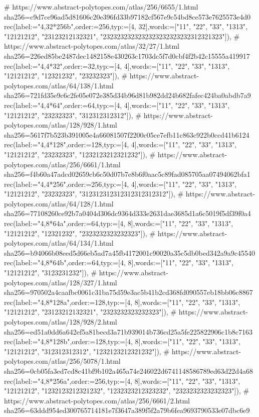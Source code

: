 \documentclass[11pt,a4paper]{article}
\begin{document}
\begin{CompleteProgram}
# https://www.abstract-polytopes.com/atlas/256/6655/1.html sha256=c9d7ce96ad5d81606c20e396fd33b97182cf567e9c54bd8ce573e7625573e4d0
rec(label:="{4,32}*256b",order:=256,typ:=[4, 32],words:=["11", "22", "33", "1313", "12121212", "23123212132321", "2323232323232323232323232312321323"]),
# https://www.abstract-polytopes.com/atlas/32/27/1.html sha256=226ed85be2487dec1482158e430263c1703dc5f7d0cbf4f2b42c15555a419917
rec(label:="{4,4}*32",order:=32,typ:=[4, 4],words:=["11", "22", "33", "1313", "12121212", "12321232", "23232323"]),
# https://www.abstract-polytopes.com/atlas/64/138/1.html sha256=721fd35e9c6c2fe05e072e385d34b96d81b982dd24b682fafec424ba0abdb7a9
rec(label:="{4,4}*64",order:=64,typ:=[4, 4],words:=["11", "22", "33", "1313", "12121212", "23232323", "312312312312"]),
# https://www.abstract-polytopes.com/atlas/128/928/1.html sha256=5617f7b523b391005e4a66081507f2200c05ce7efb11c863c922b0ccd41b6124
rec(label:="{4,4}*128",order:=128,typ:=[4, 4],words:=["11", "22", "33", "1313", "12121212", "23232323", "1232123212321232"]),
# https://www.abstract-polytopes.com/atlas/256/6661/1.html sha256=f4b60a47adcd02659cb6c50d07b7e8b6f0aac5c89fad085705aa07494062bfa1
rec(label:="{4,4}*256",order:=256,typ:=[4, 4],words:=["11", "22", "33", "1313", "12121212", "23232323", "312312312312312312312312"]),
# https://www.abstract-polytopes.com/atlas/64/128/1.html sha256=77108260ce92b7a0404d306dc9364d333e2631dae3685d1a6c5019f5df39f0a4
rec(label:="{4,8}*64a",order:=64,typ:=[4, 8],words:=["11", "22", "33", "1313", "12121212", "12321232", "2323232323232323"]),
# https://www.abstract-polytopes.com/atlas/64/134/1.html sha256=b94066b08eed5d66eb5ad7a45fb4172001c90020a35c5db0bed342a9a9c45540
rec(label:="{4,8}*64b",order:=64,typ:=[4, 8],words:=["11", "22", "33", "1313", "12121212", "3123231232"]),
# https://www.abstract-polytopes.com/atlas/128/327/1.html sha256=970502a4caafbc0061c31ba75d59e3ac5b41b2cd368fd090557eb18bb06c8867
rec(label:="{4,8}*128a",order:=128,typ:=[4, 8],words:=["11", "22", "33", "1313", "12121212", "23123212132321", "2323232323232323"]),
# https://www.abstract-polytopes.com/atlas/128/928/2.html sha256=ed51a0dd6a642ef5a81becd3a71b939014b736cd25a5fe225822906c1b8c7163
rec(label:="{4,8}*128b",order:=128,typ:=[4, 8],words:=["11", "22", "33", "1313", "12121212", "312312312312", "1232123212321232"]),
# https://www.abstract-polytopes.com/atlas/256/5078/1.html sha256=0cb05fa3ed7cd8c41bf9b102a465a74e246022d6741148586789ed63d22d4a68
rec(label:="{4,8}*256a",order:=256,typ:=[4, 8],words:=["11", "22", "33", "1313", "12121212", "1232123212321232", "1232323212323232", "2323232323232323"]),
# https://www.abstract-polytopes.com/atlas/256/6661/2.html sha256=63ddd954ed300765714181e7f3647a389f5f2a79b6fea9693790533e07dbc6e9

\end{CompleteProgram}
\end{document}
